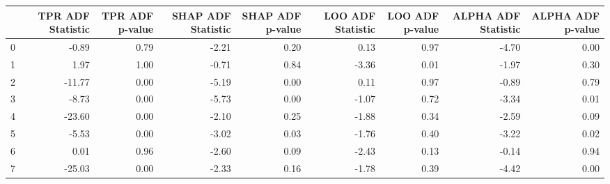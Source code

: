 \begin{tabular}{lrrrrrrrr}
\toprule
 & TPR ADF Statistic & TPR ADF p-value & SHAP ADF Statistic & SHAP ADF p-value & LOO ADF Statistic & LOO ADF p-value & ALPHA ADF Statistic & ALPHA ADF p-value \\
\midrule
0 & -0.89 & 0.79 & -2.21 & 0.20 & 0.13 & 0.97 & -4.70 & 0.00 \\
1 & 1.97 & 1.00 & -0.71 & 0.84 & -3.36 & 0.01 & -1.97 & 0.30 \\
2 & -11.77 & 0.00 & -5.19 & 0.00 & 0.11 & 0.97 & -0.89 & 0.79 \\
3 & -8.73 & 0.00 & -5.73 & 0.00 & -1.07 & 0.72 & -3.34 & 0.01 \\
4 & -23.60 & 0.00 & -2.10 & 0.25 & -1.88 & 0.34 & -2.59 & 0.09 \\
5 & -5.53 & 0.00 & -3.02 & 0.03 & -1.76 & 0.40 & -3.22 & 0.02 \\
6 & 0.01 & 0.96 & -2.60 & 0.09 & -2.43 & 0.13 & -0.14 & 0.94 \\
7 & -25.03 & 0.00 & -2.33 & 0.16 & -1.78 & 0.39 & -4.42 & 0.00 \\
\bottomrule
\end{tabular}
